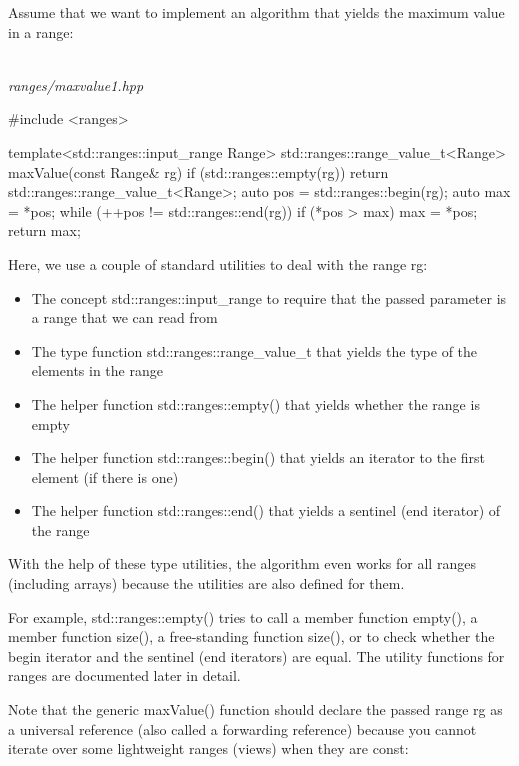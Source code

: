 Assume that we want to implement an algorithm that yields the maximum value in a range:

\noindent
\hspace*{\fill} \\ %
\textit{ranges/maxvalue1.hpp}

\begin{cpp}
#include <ranges>

template<std::ranges::input_range Range>
std::ranges::range_value_t<Range> maxValue(const Range& rg)
{
	if (std::ranges::empty(rg)) {
		return std::ranges::range_value_t<Range>{};
	}
	auto pos = std::ranges::begin(rg);
	auto max = *pos;
	while (++pos != std::ranges::end(rg)) {
		if (*pos > max) {
			max = *pos;
		}
	}
	return max;
}
\end{cpp}

Here, we use a couple of standard utilities to deal with the range rg:

\begin{itemize}
\item
The concept std::ranges::input\_range to require that the passed parameter is a range that we can read from

\item
The type function std::ranges::range\_value\_t that yields the type of the elements in the range

\item
The helper function std::ranges::empty() that yields whether the range is empty

\item
The helper function std::ranges::begin() that yields an iterator to the first element (if there is one)

\item
The helper function std::ranges::end() that yields a sentinel (end iterator) of the range
\end{itemize}

With the help of these type utilities, the algorithm even works for all ranges (including arrays) because the utilities are also defined for them.

For example, std::ranges::empty() tries to call a member function empty(), a member function size(), a free-standing function size(), or to check whether the begin iterator and the sentinel (end iterators) are equal. The utility functions for ranges are documented later in detail.

Note that the generic maxValue() function should declare the passed range rg as a universal reference (also called a forwarding reference) because you cannot iterate over some lightweight ranges (views) when they are const:


